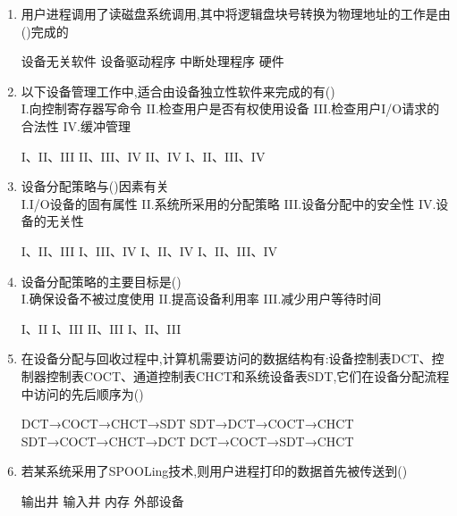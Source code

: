 \documentclass[12pt, a4paper, oneside, UTF8]{ctexbook}
\begin{document}
\begin{enumerate}
    \item 用户进程调用了读磁盘系统调用,其中将逻辑盘块号转换为物理地址的工作是由(\qquad)完成的
    \begin{choices}
    \task 设备无关软件
    \task 设备驱动程序
    \task 中断处理程序
    \task 硬件
    \end{choices}

    \item 以下设备管理工作中,适合由设备独立性软件来完成的有(\qquad)\\
    I.向控制寄存器写命令\quad
    II.检查用户是否有权使用设备\quad
    III.检查用户I/O请求的合法性\quad
    IV.缓冲管理
    \begin{choices}[2]
    \task I、II、III
    \task II、III、IV
    \task II、IV
    \task I、II、III、IV
    \end{choices}

    \item 设备分配策略与(\qquad)因素有关\\
    I.I/O设备的固有属性\quad
    II.系统所采用的分配策略\quad
    III.设备分配中的安全性\quad
    IV.设备的无关性
    \begin{choices}[2]
    \task I、II、III
    \task I、III、IV
    \task I、II、IV
    \task I、II、III、IV
    \end{choices}

    \item 设备分配策略的主要目标是(\qquad)\\
    I.确保设备不被过度使用\quad
    II.提高设备利用率\quad
    III.减少用户等待时间
    \begin{choices}[2]
    \task I、II
    \task I、III
    \task II、III
    \task I、II、III
    \end{choices}

    \item 在设备分配与回收过程中,计算机需要访问的数据结构有:设备控制表DCT、控制器控制表COCT、通道控制表CHCT和系统设备表SDT,它们在设备分配流程中访问的先后顺序为(\qquad)
    \begin{choices}[2]
    \task DCT→COCT→CHCT→SDT
    \task SDT→DCT→COCT→CHCT
    \task SDT→COCT→CHCT→DCT
    \task DCT→COCT→SDT→CHCT
    \end{choices}

    \item 若某系统采用了SPOOLing技术,则用户进程打印的数据首先被传送到(\qquad)
    \begin{choices}
    \task 输出井
    \task 输入井
    \task 内存
    \task 外部设备
    \end{choices}


\end{enumerate}
\end{document}
